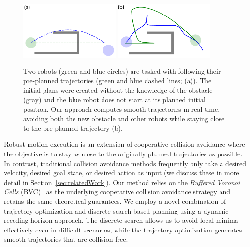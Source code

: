 \documentclass{svproc}
\begin{document}
\begin{figure}
\includegraphics[width=0.45\textwidth]{images/swap2_initial.pdf}
\hfill
\includegraphics[width=0.45\textwidth]{images/swap2_final.pdf}
\caption{Two robots (green and blue circles) are tasked with following their pre-planned trajectories (green and blue dashed lines; (a)).
The initial plans were created without the knowledge of the obstacle (gray) and the blue robot does not start at its planned initial position.
Our approach computes smooth trajectories in real-time, avoiding both the new obstacle and other robots while staying close to the pre-planned trajectory (b).
}
\label{fig:swap2}
\end{figure}

Robust motion execution is an extension of cooperative collision avoidance where the objective is to stay as close to the originally planned trajectories as possible.
In contrast, traditional collision avoidance methods frequently only take a desired velocity, desired goal state, or desired action as input (we discuss these in more detail in Section~\ref{sec:relatedWork}).
Our method relies on the \emph{Buffered Voronoi Cells} (BVC)~\cite{bufferedVoronoiCells} as the underlying cooperative collision avoidance strategy and retains the same theoretical guarantees.
We employ a novel combination of trajectory optimization and discrete search-based planning using a dynamic receding horizon approach.
The discrete search allows us to avoid local minima effectively even in difficult scenarios, while the trajectory optimization generates smooth trajectories that are collision-free.
\end{document}
